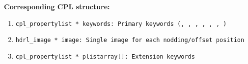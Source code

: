 \begin{datastructdef}
\textbf{Corresponding \ac{CPL} structure:}
\begin{enumerate}
    \item \texttt{cpl\_propertylist * keywords: Primary keywords (\hyperref[fits:dpr.catg]{},  \hyperref[fits:dpr.tech]{},  \hyperref[fits:dpr.type]{},  \hyperref[fits:ins.opti3.name]{},  \hyperref[fits:ins.opti9.name]{},  \hyperref[fits:ins.opti10.name]{}, \hyperref[fits:ins.opti11.name]{})}
    \item \texttt{hdrl\_image * image: Single image for each nodding/offset position}
    \item \texttt{cpl\_propertylist * plistarray[]: Extension keywords}
\end{enumerate}
\end{datastructdef}


